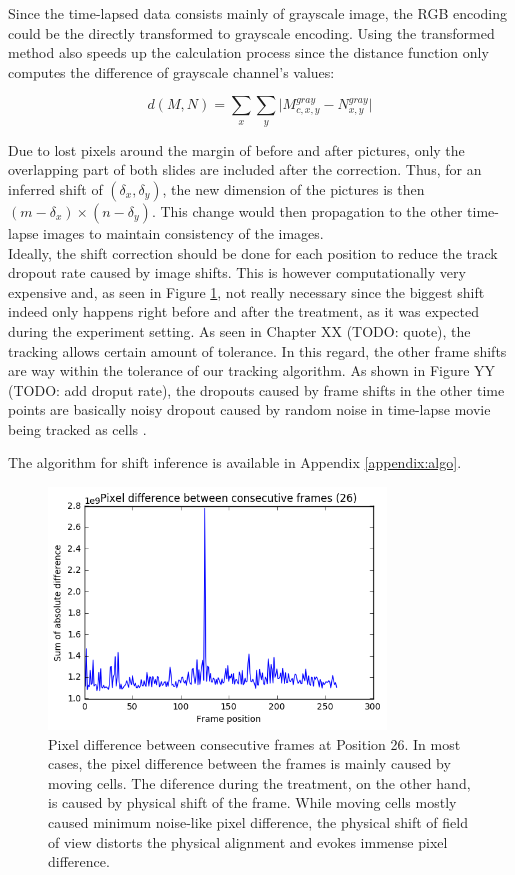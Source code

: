 \documentclass[pdftex,12pt,a4paper]{report}
\begin{document}

Since the time-lapsed data consists mainly of grayscale image, the RGB encoding could be the directly transformed to grayscale encoding. Using the transformed method also speeds up the calculation process since the distance function only computes the difference of grayscale channel's values:

$$
d(M, N) =  \sum_{x} \sum_{y} \vert M_{c, x, y}^{gray} - N_{x, y}^{gray}\vert
$$

Due to lost pixels around the margin of before and after pictures, only the overlapping part of both slides are included after the correction. Thus, for an inferred shift of $(\delta_x, \delta_y)$, the new dimension of the pictures is then $(m - \delta_x) \times (n - \delta_y)$. This change would then propagation to the other time-lapse images to maintain consistency of the images.\\

Ideally, the shift correction should be done for each position to reduce the track dropout rate caused by image shifts. This is however computationally very expensive and, as seen in Figure \ref{fig:pixdiff}, not really necessary since the biggest shift indeed only happens right before and after the treatment, as it was expected during the experiment setting. As seen in Chapter XX (TODO: quote), the tracking allows certain amount of tolerance. In this regard, the other frame shifts are way within the tolerance of our tracking algorithm. As shown in Figure YY (TODO: add droput rate), the dropouts caused by frame shifts in the other time points are basically noisy dropout caused by random noise in time-lapse movie being tracked as cells \cite{jaqaman2008robust}.

The algorithm for shift inference is available in Appendix \ref{appendix:algo}.

\begin{figure}[H]
\centering
\includegraphics[width=0.8\textwidth]{images/pixdiff}
\caption{Pixel difference between consecutive frames at Position 26. In most cases, the pixel difference between the frames is mainly caused by moving cells. The diference during the treatment, on the other hand, is caused by physical shift of the frame. While moving cells mostly caused minimum noise-like pixel difference, the physical shift of field of view distorts the physical alignment and evokes immense pixel difference.}
\label{fig:pixdiff}
\end{figure}
\end{document}
